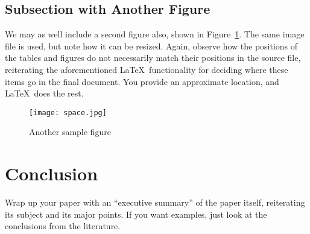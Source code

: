 \documentclass{article}
\begin{document}
\subsection{Subsection with Another Figure}

We may as well include a second figure also, shown in Figure~\ref{figure-sample2}.  The same image file is used, but note how it can be resized.  Again, observe how the positions of the tables and figures do not necessarily match their positions in the source file, reiterating the aforementioned \LaTeX\ functionality for deciding where these items go in the final document.  You provide an approximate location, and \LaTeX\ does the rest.

\begin{figure}
\centering
\texttt{[image: space.jpg]} 

\caption{Another sample figure}
\label{figure-sample2}
\end{figure}

\section{Conclusion}

Wrap up your paper with an ``executive summary'' of the paper itself, reiterating its subject and its major points.  If you want examples, just look at the conclusions from the literature.



\end{document}

